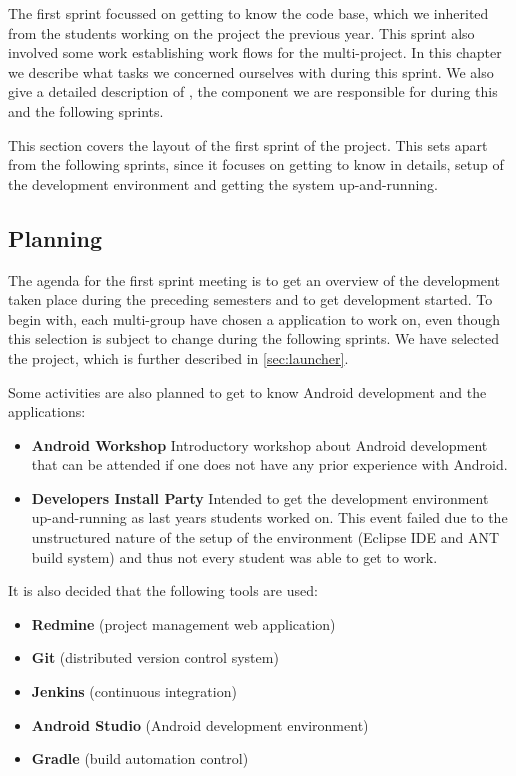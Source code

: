 The first sprint focussed on getting to know the \giraf code base, which we inherited from the students working on the project the previous year. 
This sprint also involved some work establishing work flows for the multi-project. 
In this chapter we describe what tasks we concerned ourselves with during this sprint. 
We also give a detailed description of \launcher, the component we are responsible for during this and the following sprints.

This section covers the layout of the first sprint of the project.
This sets apart from the following sprints, since it focuses on getting to know \giraf in details, setup of the development environment and getting the system up-and-running.

\subsection{Planning}\label{sec:sprint1:planning}
The agenda for the first sprint meeting is to get an overview of the development taken place during the preceding semesters and to get development started.
To begin with, each multi-group have chosen a \giraf application to work on, even though this selection is subject to change during the following sprints.
We have selected the \launcher project, which is further described in \cref{sec:launcher}.

Some activities are also planned to get to know Android development and the \giraf applications:

\begin{itemize}
\item \textbf{Android Workshop}
Introductory workshop about Android development that can be attended if one does not have any prior experience with Android.
\item \textbf{Developers Install Party}
Intended to get the \giraf development environment up-and-running as last years students worked on. 
This event failed due to the unstructured nature of the setup of the environment (Eclipse IDE and ANT build system) and thus not every student was able to get \giraf to work.
\end{itemize}

It is also decided that the following tools are used:

\begin{itemize}
\item \textbf{Redmine} (project management web application)
\item \textbf{Git} (distributed version control system)
\item \textbf{Jenkins} (continuous integration)
\item \textbf{Android Studio} (Android development environment)
\item \textbf{Gradle} (build automation control)
\end{itemize}


